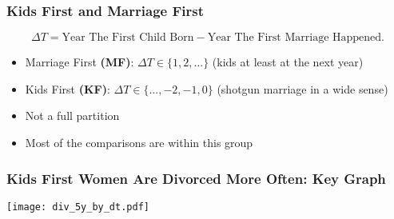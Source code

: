 \documentclass[aspectratio=169]{beamer}
\let\olditem\item
\renewcommand{\item}{%
\olditem\vspace{\fill}}
\begin{document}
\begin{frame}[label=kfandmf]
\frametitle{Kids First and Marriage First}
\[\Delta T = \text{Year The First Child Born} - \text{Year The First Marriage Happened}.\]
\begin{itemize}
\item Marriage First \textbf{(MF)}: $\Delta T \in \{1,2,...\}$ (kids at least at the next year)
\item Kids First \textbf{(KF)}: $\Delta T \in \{...,-2,-1,0\}$ (shotgun marriage in a wide sense)
\item Not a full partition%
\item Most of the comparisons are within this group
\end{itemize}
\hyperlink{extra-restrictions}{} 
\end{frame}

\begin{frame}[label=dt_graph]
\frametitle{Kids First Women Are Divorced More Often: Key Graph}
\begin{center}
\texttt{[image: div\_5y\_by\_dt.pdf]}
\end{center}
\vspace{-1cm}
\hyperlink{dt_graph_educ}{} 
\end{frame}
\end{document}
